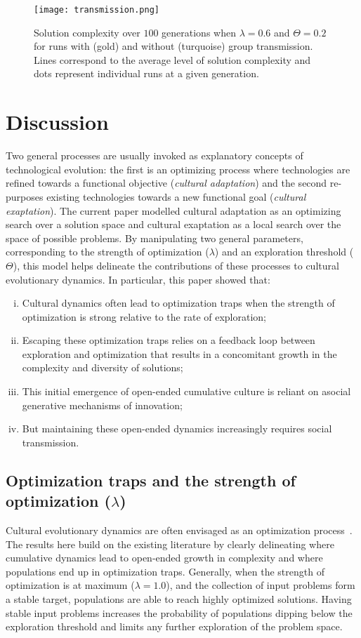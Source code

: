 \documentclass{article}
\begin{document}
\begin{figure}[H]
\begin{center}
    \texttt{[image: transmission.png]}
\end{center}
    \caption{Solution complexity over $100$ generations when $\lambda=0.6$ and $\Theta=0.2$ for runs with (gold) and without (turquoise) group transmission. Lines correspond to the average level of solution complexity and dots represent individual runs at a given generation.}
    \label{fig:transmission}
\end{figure}

\section{Discussion}
Two general processes are usually invoked as explanatory concepts of technological evolution: the first is an optimizing process where technologies are refined towards a functional objective ({\em cultural adaptation}) and the second re-purposes existing technologies towards a new functional goal ({\em cultural exaptation}). The current paper modelled cultural adaptation as an optimizing search over a solution space and cultural exaptation as a local search over the space of possible problems. By manipulating two general parameters, corresponding to the strength of optimization ($\lambda$) and an exploration threshold ($\Theta$), this model helps delineate the contributions of these processes to cultural evolutionary dynamics. In particular, this paper showed that:

\begin{enumerate}[(i)]
    \item Cultural dynamics often lead to optimization traps when the strength of optimization is strong relative to the rate of exploration;
    \item Escaping these optimization traps relies on a feedback loop between exploration and optimization that results in a concomitant growth in the complexity and diversity of solutions;
    \item This initial emergence of open-ended cumulative culture is reliant on asocial generative mechanisms of innovation;
    \item But maintaining these open-ended dynamics increasingly requires social transmission.
\end{enumerate}

\subsection{Optimization traps and the strength of optimization ($\lambda$)}
Cultural evolutionary dynamics are often envisaged as an optimization process~\cite{xxxx}. The results here build on the existing literature by clearly delineating where cumulative dynamics lead to open-ended growth in complexity and where populations end up in optimization traps. Generally, when the strength of optimization is at maximum ($\lambda=1.0$), and the collection of input problems form a stable target, populations are able to reach highly optimized solutions. Having stable input problems increases the probability of populations dipping below the exploration threshold and limits any further exploration of the problem space.
\end{document}
